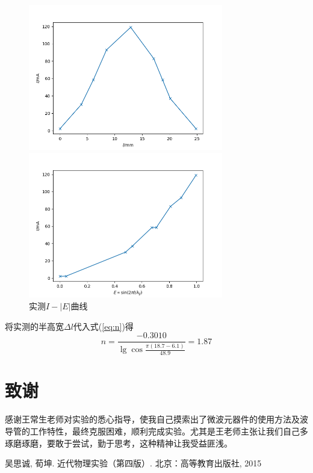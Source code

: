 \documentclass[aps,pre,12pt,preprint,onecolumn,showpacs,showkeys]{revtex4-1}
\begin{document}
        \begin{figure}[ht]
            \begin{minipage}{.5\textwidth}
                \centering
                \includegraphics[width=85mm]{I_l}
                \caption{\label{fig:I_l}%
                实测$I-l$曲线}
            \end{minipage}%
            \begin{minipage}{0.5\textwidth}
                \centering
                \includegraphics[width=85mm]{I_E}
                \caption{\label{fig:I_E}%
                实测$I-|E|$曲线}
            \end{minipage}
        \end{figure}

        将实测的半高宽$\Delta l$代入式(\ref{eq:n})得
        \begin{equation}
            n=\frac{-0.3010}{\lg \cos\frac{\pi (18.7-6.1)}{48.9}}=1.87
        \end{equation}

\section{致谢}
感谢王常生老师对实验的悉心指导，使我自己摸索出了微波元器件的使用方法及波导管的工作特性，最终克服困难，顺利完成实验。尤其是王老师主张让我们自己多琢磨琢磨，要敢于尝试，勤于思考，这种精神让我受益匪浅。
    
\begin{thebibliography}{}
 吴思诚, 荀坤. 近代物理实验（第四版）. 北京：高等教育出版社, 2015
\end{thebibliography}
\end{document}
